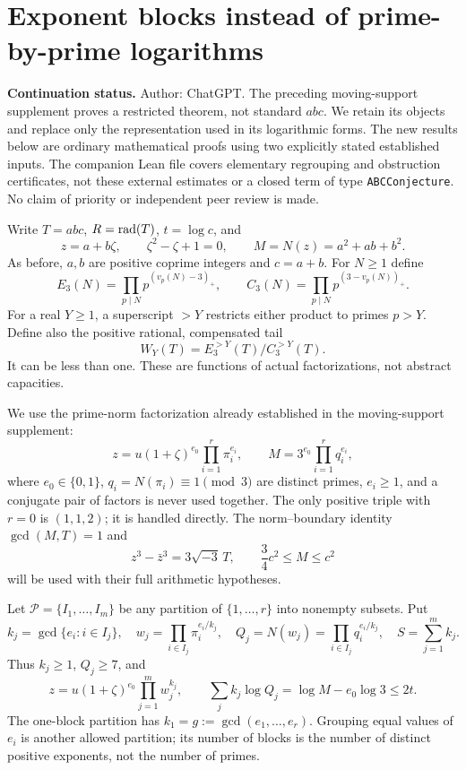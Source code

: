 \section{Exponent blocks instead of prime-by-prime logarithms}
\label{sec:ep-start}
\noindent\textbf{Continuation status.} Author: ChatGPT. The preceding moving-support
supplement proves a restricted theorem, not standard $abc$. We retain its
objects and replace only the representation used in its logarithmic forms.
The new results below are ordinary mathematical proofs using two explicitly
stated established inputs. The companion Lean file covers elementary
regrouping and obstruction certificates, not these external estimates or a
closed term of type \texttt{ABCConjecture}. No claim of priority or independent
peer review is made.

Write $T=abc$, $R=\operatorname{rad}(T)$, $t=\log c$, and
\[
 z=a+b\zeta,\qquad \zeta^2-\zeta+1=0,\qquad
 M=N(z)=a^2+ab+b^2.
\]
As before, $a,b$ are positive coprime integers and $c=a+b$.
For $N\ge1$ define
\[
 E_3(N)=\prod_{p\mid N}p^{(v_p(N)-3)_+},\qquad
 C_3(N)=\prod_{p\mid N}p^{(3-v_p(N))_+}.
\]
For a real $Y\ge1$, a superscript $>Y$ restricts either product to primes
$p>Y$. Define also the positive rational, compensated tail
\[
 W_Y(T)=E_3^{>Y}(T)/C_3^{>Y}(T).
\]
It can be less than one. These are functions of actual factorizations, not
abstract capacities.

We use the prime-norm factorization already established in the moving-support
supplement:
\begin{equation}\label{eq:ep-factor}
 z=u(1+\zeta)^{e_0}\prod_{i=1}^r\pi_i^{e_i},\qquad
 M=3^{e_0}\prod_{i=1}^r q_i^{e_i},
\end{equation}
where $e_0\in\{0,1\}$, $q_i=N(\pi_i)\equiv1\pmod3$ are distinct primes,
$e_i\ge1$, and a conjugate pair of factors is never used together.
The only positive triple with $r=0$ is $(1,1,2)$; it is handled directly.
The norm--boundary identity $\gcd(M,T)=1$ and
\begin{equation}\label{eq:ep-cubic}
 z^3-\bar z^3=3\sqrt{-3}\,T,\qquad
 \frac34 c^2\le M\le c^2
\end{equation}
will be used with their full arithmetic hypotheses.

\begin{definition}\label{def:ep-blocks}
Let $\mathcal P=\{I_1,\ldots,I_m\}$ be any partition of $\{1,\ldots,r\}$
into nonempty subsets. Put
\[
 k_j=\gcd\{e_i:i\in I_j\},\quad
 w_j=\prod_{i\in I_j}\pi_i^{e_i/k_j},\quad
 Q_j=N(w_j)=\prod_{i\in I_j}q_i^{e_i/k_j},\quad S=\sum_{j=1}^m k_j.
\]
Thus $k_j\ge1$, $Q_j\ge7$, and
\begin{equation}\label{eq:ep-regroup}
 z=u(1+\zeta)^{e_0}\prod_{j=1}^m w_j^{k_j},\qquad
 \sum_j k_j\log Q_j=\log M-e_0\log3\le2t.
\end{equation}
The one-block partition has $k_1=g:=\gcd(e_1,\ldots,e_r)$.
Grouping equal values of $e_i$ is another allowed partition; its number of
blocks is the number of distinct positive exponents, not the number of primes.
\end{definition}

